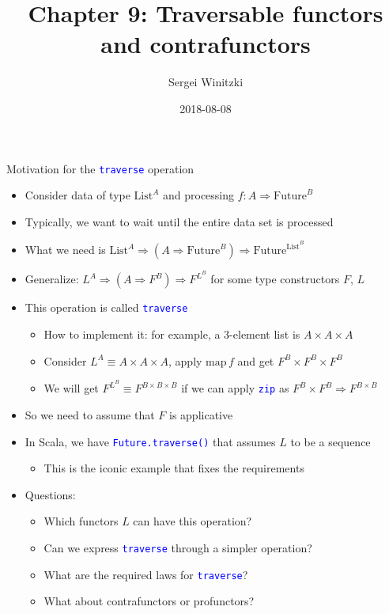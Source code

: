 \documentclass[english]{beamer}
\title[Chapter 9: Traversable (contra)functors]{Chapter 9: Traversable functors and contrafunctors}
\author{Sergei Winitzki}
\date{2018-08-08}
\institute[ABTB]{Academy by the Bay}
\begin{document}
\frame{\titlepage}
\begin{frame}{Motivation for the \texttt{\textcolor{blue}{\footnotesize{}traverse}}
operation}
\begin{itemize}
\item Consider data of type $\text{List}^{A}$ and processing $f:A\Rightarrow\text{Future}^{B}$
\item Typically, we want to wait until the entire data set is processed
\item What we need is $\text{List}^{A}\Rightarrow\left(A\Rightarrow\text{Future}^{B}\right)\Rightarrow\text{Future}^{\text{List}^{B}}$
\item Generalize: $L^{A}\Rightarrow\left(A\Rightarrow F^{B}\right)\Rightarrow F^{L^{B}}$
for some type constructors $F$, $L$
\item This operation is called \texttt{\textcolor{blue}{\footnotesize{}traverse}} 
\begin{itemize}
\item How to implement it: for example, a 3-element list is $A\times A\times A$
\item Consider $L^{A}\equiv A\times A\times A$, apply $\text{map}\,f$
and get $F^{B}\times F^{B}\times F^{B}$
\item We will get $F^{L^{B}}\equiv F^{B\times B\times B}$ if we can apply
\texttt{\textcolor{blue}{\footnotesize{}zip}} as $F^{B}\times F^{B}\Rightarrow F^{B\times B}$
\end{itemize}
\item So we need to assume that $F$ is applicative
\item In Scala, we have \texttt{\textcolor{blue}{\footnotesize{}Future.traverse()}}
that assumes $L$ to be a sequence
\begin{itemize}
\item This is the iconic example that fixes the requirements
\end{itemize}
\item Questions:
\begin{itemize}
\item Which functors $L$ can have this operation?
\item Can we express \texttt{\textcolor{blue}{\footnotesize{}traverse}}
through a simpler operation?
\item What are the required laws for \texttt{\textcolor{blue}{\footnotesize{}traverse}}?
\item What about contrafunctors or profunctors?
\end{itemize}
\end{itemize}
\end{frame}
\end{document}
